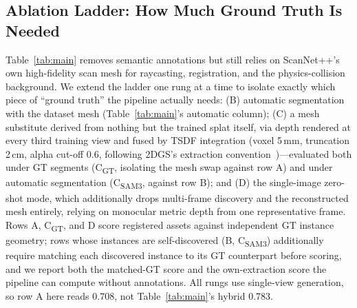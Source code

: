 \subsection{Ablation Ladder: How Much Ground Truth Is Needed}
\label{sec:ladder}
Table~\ref{tab:main} removes semantic annotations but still relies on
ScanNet++'s own high-fidelity scan mesh for raycasting, registration,
and the physics-collision background. We extend the ladder one rung at
a time to isolate exactly which piece of ``ground truth'' the pipeline
actually needs: (B) automatic segmentation with the dataset mesh
(Table~\ref{tab:main}'s automatic column); (C) a mesh substitute derived
from nothing but the trained splat itself, via depth rendered at every
third training view and fused by TSDF integration (voxel 5\,mm,
truncation 2\,cm, alpha cut-off 0.6, following 2DGS's extraction
convention~\cite{twodgs})---evaluated both under GT segments
(C\textsubscript{GT}, isolating the mesh swap against row A) and under
automatic segmentation (C\textsubscript{SAM3}, against row B); and (D)
the single-image zero-shot mode, which additionally drops multi-frame
discovery and the reconstructed mesh entirely, relying on monocular
metric depth from one representative frame. Rows A, C\textsubscript{GT},
and D score registered assets against independent GT instance geometry;
rows whose instances are self-discovered (B, C\textsubscript{SAM3})
additionally require matching each discovered instance to its GT
counterpart before scoring, and we report both the matched-GT score and
the own-extraction score the pipeline can compute without annotations.
All rungs use single-view generation, so row A here reads 0.708, not
Table~\ref{tab:main}'s hybrid 0.783.

